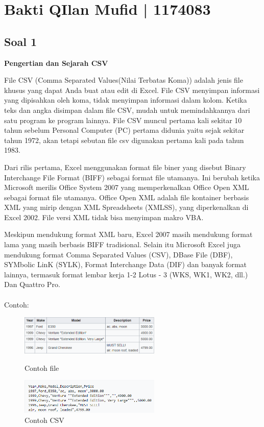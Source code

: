 \section{Bakti QIlan Mufid | 1174083}
\subsection{Soal 1}

\textbf{Pengertian dan Sejarah CSV}

	File CSV (Comma Separated Values(Nilai Terbatas Koma)) adalah jenis file khusus yang dapat Anda buat atau edit di Excel. File CSV menyimpan informasi yang dipisahkan oleh koma, tidak menyimpan informasi dalam kolom. Ketika teks dan angka disimpan dalam file CSV, mudah untuk memindahkannya dari satu program ke program lainnya. File CSV muncul pertama kali sekitar 10 tahun sebelum Personal Computer (PC) pertama  didunia yaitu sejak sekitar tahun 1972, akan tetapi sebutan file csv digunakan pertama kali pada tahun 1983.

	Dari rilis pertama, Excel menggunakan format file biner yang disebut Binary Interchange File Format (BIFF) sebagai format file utamanya. Ini berubah ketika Microsoft merilis Office System 2007 yang memperkenalkan Office Open XML sebagai format file utamanya. Office Open XML adalah file kontainer berbasis XML yang mirip dengan XML Spreadsheets (XMLSS), yang diperkenalkan di Excel 2002. File versi XML tidak bisa menyimpan makro VBA.

	Meskipun mendukung format XML baru, Excel 2007 masih mendukung format lama yang masih berbasis BIFF tradisional. Selain itu Microsoft Excel juga mendukung format Comma Separated Values (CSV), DBase File (DBF), SYMbolic LinK (SYLK), Format Interchange Data (DIF) dan banyak format lainnya, termasuk format lembar kerja 1-2 Lotus - 3 (WKS, WK1, WK2, dll.) Dan Quattro Pro.
\paragraph{}Contoh:\\
	\begin{figure} [ht]
		\centerline{\includegraphics[width=0.6\textwidth]{figures/4/1174083/Teori/contohCSV1.png}}
		\caption{Contoh file}
		\label{Contoh CSV}
		\centerline{\includegraphics[width=0.6\textwidth]{figures/4/1174083/Teori/contohCSV2.png}}
		\caption{Contoh CSV}
		\label{Contoh CSV2}
	\end{figure}
	
